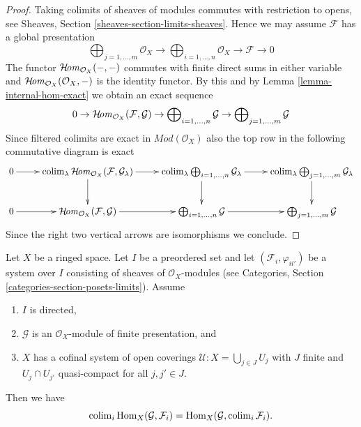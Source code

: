 \begin{proof}
Taking colimits of sheaves of modules commutes with restriction to opens, see
Sheaves, Section \ref{sheaves-section-limits-sheaves}. Hence we may assume
$\mathcal{F}$ has a global presentation
$$
\bigoplus\nolimits_{j = 1, \ldots, m}
\mathcal{O}_X
\longrightarrow
\bigoplus\nolimits_{i = 1, \ldots, n}
\mathcal{O}_X
\to
\mathcal{F}
\to
0
$$
The functor $\mathop{\mathcal{H}\!\mathit{om}}\nolimits_{\mathcal{O}_X}(-, -)$ commutes with finite direct sums
in either variable and $\mathop{\mathcal{H}\!\mathit{om}}\nolimits_{\mathcal{O}_X}(\mathcal{O}_X, -)$
is the identity functor. By this and by Lemma \ref{lemma-internal-hom-exact}
we obtain an exact sequence
$$
0 \to
\mathop{\mathcal{H}\!\mathit{om}}\nolimits_{\mathcal{O}_X}(\mathcal{F}, \mathcal{G}) \to
\bigoplus\nolimits_{i = 1, \ldots, n} \mathcal{G} \to
\bigoplus\nolimits_{j = 1, \ldots, m} \mathcal{G}
$$
Since filtered colimits are exact in $\textit{Mod}(\mathcal{O}_X)$
also the top row in the following commutative diagram is exact
$$
\xymatrix{
0 \ar[r] &
\colim_\lambda \SheafHom_{\mathcal{O}_X}(\mathcal{F}, \mathcal{G}_\lambda)
\ar[r] \ar[d] &
\colim_\lambda \bigoplus\nolimits_{i = 1, \ldots, n} \mathcal{G}_\lambda
\ar[r] \ar[d] &
\colim_\lambda \bigoplus\nolimits_{j = 1, \ldots, m} \mathcal{G}_\lambda
\ar[d] \\
0 \ar[r] &
\SheafHom_{\mathcal{O}_X}(\mathcal{F}, \mathcal{G}) \ar[r] &
\bigoplus\nolimits_{i = 1, \ldots, n} \mathcal{G} \ar[r] &
\bigoplus\nolimits_{j = 1, \ldots, m} \mathcal{G}
}
$$
Since the right two vertical arrows are isomorphisms we conclude.
\end{proof}

\begin{lemma}
\label{lemma-finite-presentation-quasi-compact-colimit}
Let $X$ be a ringed space.
Let $I$ be a preordered set and
let $(\mathcal{F}_i, \varphi_{ii'})$ be a system over $I$
consisting of sheaves of $\mathcal{O}_X$-modules
(see Categories, Section \ref{categories-section-posets-limits}).
Assume
\begin{enumerate}
\item $I$ is directed,
\item $\mathcal{G}$ is an $\mathcal{O}_X$-module of finite presentation, and
\item $X$ has a cofinal system of open coverings
$\mathcal{U} : X = \bigcup_{j\in J} U_j$ with
$J$ finite and $U_j \cap U_{j'}$ quasi-compact
for all $j, j' \in J$.
\end{enumerate}
Then we have
$$
\mathop{\mathrm{colim}}\nolimits_i \mathop{\mathrm{Hom}}\nolimits_X(\mathcal{G}, \mathcal{F}_i)
=
\mathop{\mathrm{Hom}}\nolimits_X(\mathcal{G}, \mathop{\mathrm{colim}}\nolimits_i \mathcal{F}_i).
$$
\end{lemma}

